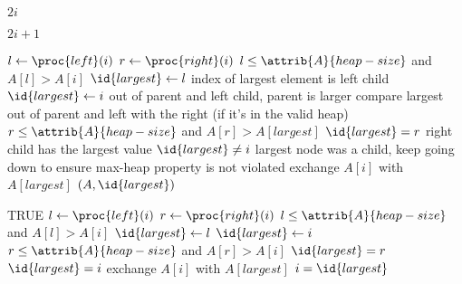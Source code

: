 \documentclass{article}
\begin{document}
\begin{codebox}
\li \Return $2i$
\end{codebox}

\begin{codebox}
\li \Return $2i + 1$
\end{codebox}

\begin{codebox}
\li $l \gets \proc{left}(i)$
\li $r \gets \proc{right}(i)$
\li \If $l \leq \attrib{A}{heap-size}$ and $A[l] > A[i]$
\li     \Then
            $\id{largest} \gets l$ \Comment index of largest element is left child
\li     \Else
\li         $\id{largest} \gets i$ \Comment out of parent and left child, parent is larger
    \End
\li \Comment compare largest out of parent and left with the right (if it's in the valid heap)
\li \If $r \leq \attrib{A}{heap-size}$ and $A[r] > A[largest]$
\li     \Then
            $\id{largest} = r$ \Comment right child has the largest value
        \End
\li \If $\id{largest} \neq i$
\li     \Then 
            \Comment largest node was a child, keep going down to ensure max-heap property is not violated
\li         exchange $A[i]$ with $A[largest]$
\li         {}$(A, \id{largest})$
        \End
\end{codebox}

\begin{codebox}
\li \While TRUE
\li \Do
        $l \gets \proc{left}(i)$
\li     $r \gets \proc{right}(i)$
\li     \If $l \leq \attrib{A}{heap-size}$ and $A[l] > A[i]$
\li         \Then
                $\id{largest} \gets l$
\li         \Else
\li             $\id{largest} \gets i$
            \End
\li     \If $r \leq \attrib{A}{heap-size}$ and $A[r] > A[i]$
\li         \Then
                $\id{largest} = r$
            \End
\li     \If $\id{largest} = i$
\li         \Then
                \Return
            \End
\li     exchange $A[i]$ with $A[largest]$
\li     $i = \id{largest}$
    \End
\end{codebox}
\end{document}
